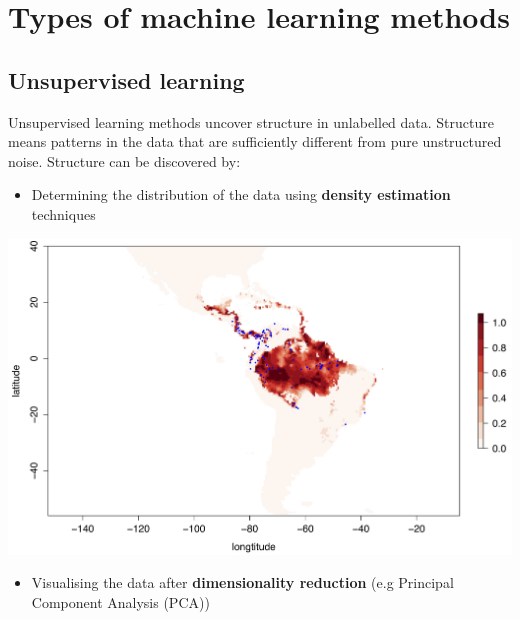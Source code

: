 \documentclass[]{book}
\providecommand{\tightlist}{%
  \setlength{\itemsep}{0pt}\setlength{\parskip}{0pt}}
\begin{document}
\hypertarget{types-of-machine-learning-methods}{%
\section{Types of machine learning methods}\label{types-of-machine-learning-methods}}

\hypertarget{unsupervised-learning}{%
\subsection*{Unsupervised learning}\label{unsupervised-learning}}

Unsupervised learning methods uncover structure in unlabelled data. Structure means patterns in the data that are sufficiently different from pure unstructured noise. Structure can be discovered by:

\begin{itemize}
\tightlist
\item
  Determining the distribution of the data using \textbf{density estimation} techniques
\end{itemize}

\begin{center}\includegraphics[width=600px]{_img//01-density} \end{center}

\begin{itemize}
\tightlist
\item
  Visualising the data after \textbf{dimensionality reduction} (e.g Principal Component Analysis (PCA))
\end{itemize}
\end{document}
